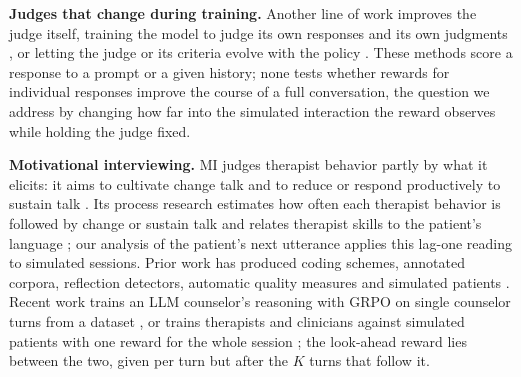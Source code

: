 \textbf{Judges that change during training.}
Another line of work improves the judge itself, training the model to judge its own responses
\citep{yuan2024selfrewarding} and its own judgments \citep{wu2025metarewarding}, or letting the
judge or its criteria evolve with the policy \citep{wang2026dynamicrubric, wang2026serpo,
chu2026jzero}. These methods score a response to a prompt or a given history; none tests whether
rewards for individual responses improve the course of a full conversation, the question we
address by changing how far into the simulated interaction the reward observes while holding the
judge fixed.

\textbf{Motivational interviewing.}
MI \citep{miller1991mi} judges therapist behavior partly by what it elicits: it aims to cultivate
change talk and to reduce or respond productively to sustain talk \citep{moyers2016miti}. Its
process research estimates how often each therapist behavior is followed by change or sustain talk
\citep{moyers2006therapist, apodaca2016which} and relates therapist skills to the patient's
language \citep{magill2014technical, magill2018meta}; our analysis of the patient's next utterance
applies this lag-one reading to simulated sessions. Prior work has produced coding schemes,
annotated corpora, reflection detectors, automatic quality measures and simulated patients
\citep{moyers2016miti, wu2022annomi, can2016sounds, min2022pair, perezrosas2019goodcounselor,
yosef2024assessing, steenstra2025scaffolding, wang2024patientpsi}. Recent work trains an LLM
counselor's reasoning with GRPO on single counselor turns from a dataset \citep{yang2026mithinker},
or trains therapists and clinicians against simulated patients with one reward for the whole
session \citep{huang2026therapygym, lievin2026residencyrl}; the look-ahead reward lies between the
two, given per turn but after the $K$ turns that follow it.

